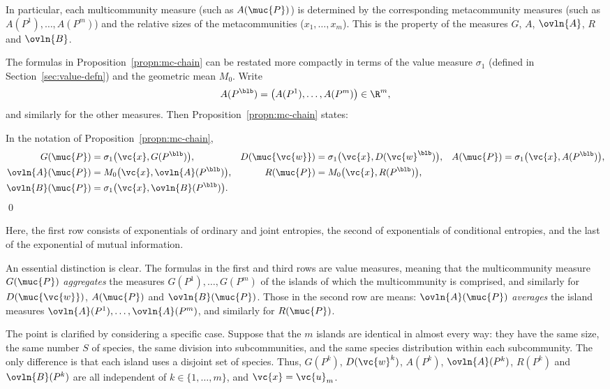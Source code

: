 In particular, each multicommunity measure (such as $A(\muc{P})$) is
determined by the corresponding metacommunity measures (such as $A(P^1),
\ldots, A(P^m)$) and the relative sizes of the metacommunities 
($x_1, \ldots, x_m$).  This is the %
%
%
%
property of the measures $G$, $A$, $\ovln{A}$, $R$ and $\ovln{B}$.

The formulas in Proposition~\ref{propn:mc-chain} can be restated more
compactly in terms of the value measure $\sigma_1$ (defined in
Section~\ref{sec:value-defn}) and the geometric mean $M_0$.  Write
\[
A(P^\blb) = \bigl( A(P^1), \ldots, A(P^m) \bigr) \in \R^m, 
\]
and similarly for the other measures.  Then Proposition~\ref{propn:mc-chain}
states:

\begin{cor}
In the notation of Proposition~\ref{propn:mc-chain},
% 
\begin{align*}
G(\muc{P})      &       
= \sigma_1\bigl( \vc{x}, G(P^\blb) \bigr),      &
D(\muc{\vc{w}}) &
= \sigma_1\bigl( \vc{x}, D(\vc{w}^\blb) \bigr), &
A(\muc{P})      &
= \sigma_1\bigl( \vc{x}, A(P^\blb) \bigr),      \\
\ovln{A}(\muc{P})       &
= M_0\bigl( \vc{x}, \ovln{A}(P^\blb) \bigr),    &
R(\muc{P})      &
= M_0\bigl( \vc{x}, R(P^\blb) \bigr),   \\
\ovln{B}(\muc{P})       &
= \sigma_1\bigl( \vc{x}, \ovln{B}(P^\blb) \bigr).
\end{align*}
\qed
\end{cor}

Here, the first row consists of exponentials of ordinary and joint
entropies, the second of exponentials of conditional entropies, and the
last of the exponential of mutual information.

An essential distinction is clear.  The formulas in the
first and third rows are value measures, meaning that the multicommunity
measure $G(\muc{P})$ \emph{aggregates} the measures $G(P^1), \ldots,
G(P^m)$ of the islands%
%
% 
of which the multicommunity is comprised, and similarly for
$D(\muc{\vc{w}})$, $A(\muc{P})$ and $\ovln{B}(\muc{P})$.  Those in the
second row are means: $\ovln{A}(\muc{P})$ \emph{averages} the island
measures $\ovln{A}(P^1), \ldots, \ovln{A}(P^m)$, and similarly for
$R(\muc{P})$.

The point is clarified by considering a specific case.  Suppose that the
$m$ islands are identical in almost every way: they have the same size, the
same number $S$ of species, the same division into subcommunities, and the
same species distribution within each subcommunity.  The only difference is
that each island uses a disjoint set of species.  Thus, $G(P^k)$,
$D(\vc{w}^k)$, $A(P^k)$, $\ovln{A}(P^k)$, $R(P^k)$ and $\ovln{B}(P^k)$ are
all independent of $k \in \{1, \ldots, m\}$, and $\vc{x} = \vc{u}_m$.  

